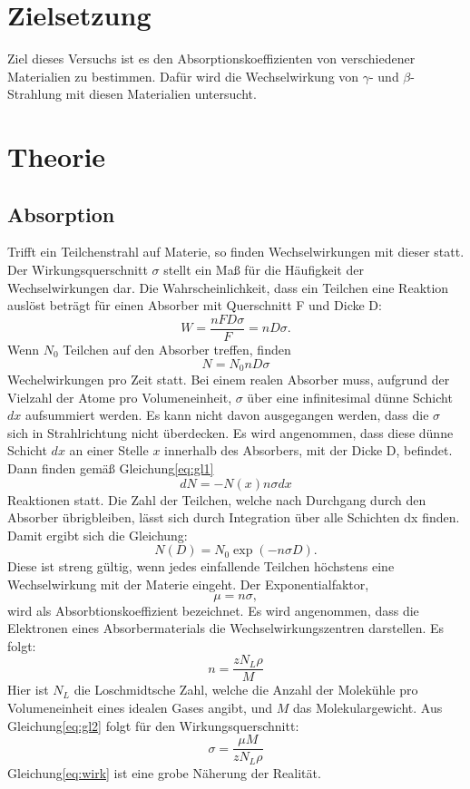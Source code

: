 \section{Zielsetzung}
Ziel dieses Versuchs ist es den Absorptionskoeffizienten von verschiedener Materialien zu bestimmen.
Dafür wird die Wechselwirkung von $\gamma$- und $\beta$-Strahlung mit diesen Materialien untersucht.
\section{Theorie}
\label{sec:Theorie}
\subsection{Absorption}
Trifft ein Teilchenstrahl auf Materie, so finden Wechselwirkungen mit dieser statt.
Der Wirkungsquerschnitt $\sigma$ stellt ein Maß für die Häufigkeit der Wechselwirkungen dar.
Die Wahrscheinlichkeit, dass ein Teilchen eine Reaktion auslöst beträgt für einen Absorber mit Querschnitt F und Dicke D:
\begin{equation}
  W= \frac{nFD\sigma}{F}= nD \sigma    .
\end{equation}
Wenn $N_0$ Teilchen auf den Absorber treffen, finden
\begin{equation}
  N = N_0 nD \sigma
  \label{eq:gl1}
\end{equation}
Wechelwirkungen pro Zeit statt.
Bei einem realen Absorber muss, aufgrund der Vielzahl der Atome pro Volumeneinheit, $\sigma$ über eine infinitesimal dünne Schicht $dx$ aufsummiert werden.
Es kann nicht davon ausgegangen werden, dass die $\sigma$ sich in Strahlrichtung nicht überdecken.
Es wird angenommen, dass diese dünne Schicht $dx$ an einer Stelle $x$ innerhalb des Absorbers, mit der Dicke D, befindet.
Dann finden gemäß Gleichung\eqref{eq:gl1}
\begin{equation}
  dN = -N(x) n \sigma dx
\end{equation}
Reaktionen statt.
Die Zahl der Teilchen, welche nach Durchgang durch den Absorber übrigbleiben, lässt sich durch Integration über alle Schichten dx finden.
Damit ergibt sich die Gleichung:
\begin{equation}
  N(D) = N_0 \exp(-n\sigma D)  .
\end{equation}
Diese ist streng gültig, wenn jedes einfallende Teilchen höchstens eine Wechselwirkung mit der Materie eingeht.
Der Exponentialfaktor,
\begin{equation}
  \mu = n \sigma   ,
\end{equation}
wird als Absorbtionskoeffizient bezeichnet.
Es wird angenommen, dass die Elektronen eines Absorbermaterials die Wechselwirkungszentren darstellen.
Es folgt:
\begin{equation}
  n= \frac{z N_L \rho}{M}
  \label{eq:gl2}
\end{equation}
Hier ist $N_L$ die Loschmidtsche Zahl, welche die Anzahl der Molekühle pro Volumeneinheit eines idealen Gases angibt, und $M$ das Molekulargewicht.
Aus Gleichung\eqref{eq:gl2} folgt für den Wirkungsquerschnitt:
\begin{equation}
  \sigma=\frac{\mu M}{z N_L \rho}
  \label{eq:wirk}
\end{equation}
Gleichung\eqref{eq:wirk} ist eine grobe Näherung der Realität.
